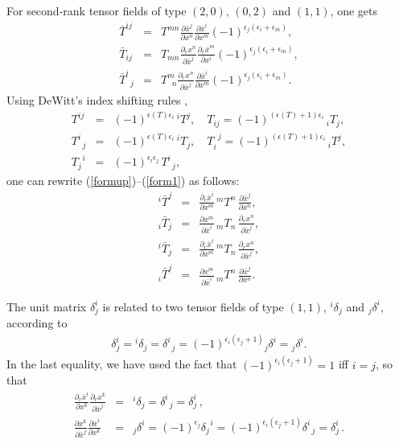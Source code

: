 \documentclass[a4paper,11pt]{article}
\begin{document}
For second-rank tensor fields of type $(2,0),\,(0,2)$ and $(1,1)$, one gets
\begin{eqnarray}
\label{formup}
{\bar T}^{ij}&=&
T^{mn}\frac{\partial {\bar x}^j}{\partial x^n}
\frac{\partial {\bar x}^i}{\partial x^m}
(-1)^{\epsilon_j(\epsilon_i+\epsilon_m)},\\
\label{form}
{\bar T}_{ij}&=&
T_{mn}\frac{\partial_r x^n}{\partial {\bar x}^j}
\frac{\partial_r {\bar x}^m}{\partial x^i}
(-1)^{\epsilon_j(\epsilon_i+\epsilon_m)},\\
\label{form1}
{\bar T}^i_{\;\;j}&=&
T^m_{\;\;n}\frac{\partial_r x^n}{\partial {\bar x}^j}
\frac{\partial {\bar x}^i}{\partial x^m}
(-1)^{\epsilon_j(\epsilon_i+\epsilon_m)}.
\end{eqnarray}
Using DeWitt's index shifting rules \cite{DeWitt},
\begin{eqnarray}
\label{shift} T^{ij}&=&(-1)^{\epsilon(T)\epsilon_i}\, {^iT^j},
\quad
T_{ij}=(-1)^{(\epsilon(T)+1)\epsilon_i}\, {_iT_j},\\
T^{i}_{\;\;j}&=&(-1)^{\epsilon(T)\epsilon_i}\, {^iT_j}, \quad
T_i^{\;\;j}=(-1)^{(\epsilon(T)+1)\epsilon_i}\, {_iT^j},\\
T^{\;\;i}_j&=&(-1)^{\epsilon_i\epsilon_j}\, T^i_{\;\;j},
\end{eqnarray}
one can rewrite (\ref{formup})--(\ref{form1}) as follows:
\begin{eqnarray}
\label{formsh} {^i{\bar T}^j}&=& \frac{\partial_r {\bar
x}^i}{\partial x^m}\,{^mT^n}\,
\frac{\partial {\bar x}^j}{\partial x^n},\\
\label{formsh1} {_i{\bar T}_j}&=& \frac{\partial x^m}{\partial
{\bar x}^i}\,{_mT_n}\,
\frac{\partial_r  x^n}{\partial {\bar x}^j},\\
\label{formsh2} {^i{\bar T}_j}&=& \frac{\partial_r {\bar
x}^i}{\partial x^m}\,{^m T_n}\,
\frac{\partial_r x^n}{\partial {\bar x}^j},\\
\label{formsh3} {_i{\bar T}^j}&=& \frac{\partial x^m}{\partial
{\bar x}^i}\,{_m T^n}\, \frac{\partial {\bar x}^j}{\partial x^n}.
\end{eqnarray}

The unit matrix $\delta _{j}^{i}$ is related to two tensor fields of type $%
(1,1)$, ${^{i}\delta _{j}}$ and ${_{j}\delta ^{i}}$, according to
\begin{eqnarray}
\label{unit} \delta^i_j={^i\delta_j}=\delta^i_{\;\;j}=
(-1)^{\epsilon_i(\epsilon_j+1)}{_j\delta^i} = {_j\delta^i}.
\end{eqnarray}
In the last equality, we have used the fact that $(-1)^{\epsilon
_{i}(\epsilon _{j}+1)}=1$ iff $i=j$, so that
\begin{eqnarray}
\label{unitJ}
\frac{\partial_r {\bar x}^i}{\partial x^k}
\frac{\partial_r x^k}{\partial {\bar x}^j}&=&{^i\delta_j}=
\delta^i_{\;\;j}=\delta^i_j\,,
\\
\label{unitj}
\frac{\partial x^k}{\partial {\bar x}^j}
\frac{\partial {\bar x}^i}{\partial x^k}
&=&{_j\delta^i}=(-1)^{\epsilon_j}\delta^{\;\;i}_j=
(-1)^{\epsilon_i(\epsilon_j+1)}\delta^i_{\;\;j}=\delta^i_j\,.
\end{eqnarray}
\end{document}
